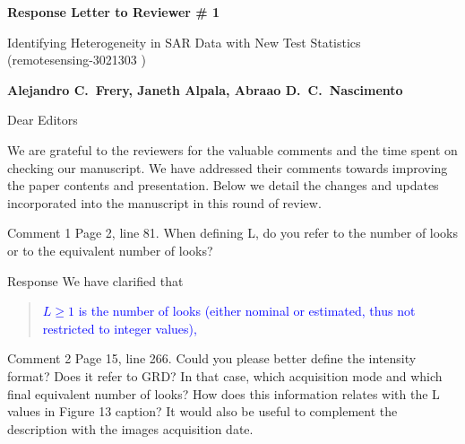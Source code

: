 \documentclass[11pt]{report}
\begin{document}
\begin{center}
\large{\textbf{Response Letter to Reviewer \# 1}}

\vglue 0.3cm

\huge{ Identifying Heterogeneity in SAR Data with New Test Statistics\\ (remotesensing-3021303 )}
\end{center}

\begin{center}
\textbf{Alejandro C.\ Frery, Janeth Alpala, Abraao D.\ C.\ Nascimento }
\end{center}

\date{\today}



\vspace{2cm}
\noindent Dear Editors
\bigskip

\noindent We are grateful to the reviewers for the valuable comments and the time spent on checking our manuscript. 
We have addressed their comments towards improving the paper contents and presentation. 
Below we detail the changes and updates incorporated into the manuscript in this round of review.

\medskip


\begin{reviewbox}{Comment 1}
Page 2, line 81. When defining L, do you refer to the number of looks or to the equivalent number of looks?

\end{reviewbox}

\begin{responsebox}{Response}
We have clarified that
\begin{quote}
	\textcolor{blue}{\(L \geq 1\) is the number of looks (either nominal or estimated, thus not restricted to integer values),}
\end{quote}
\end{responsebox}

\begin{reviewbox}{Comment 2}
Page 15, line 266. Could you please better define the intensity format? Does it refer to GRD? In that case, which acquisition mode and which final equivalent number of looks? How does this information relates with the L values in Figure 13 caption? It would also be useful to complement the description with the images acquisition date.
\end{reviewbox}
\end{document}
